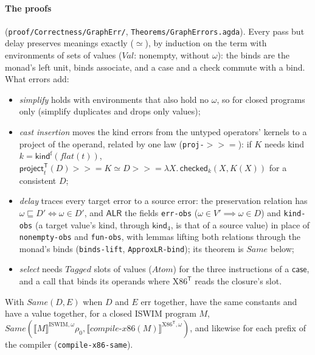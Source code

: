 \documentclass[10pt]{article}
\theoremstyle{acmplain}
\newcommand{\SEM}[1]{\llbracket #1 \rrbracket}
\newcommand{\key}[1]{\mathsf{#1}}
\newcommand{\pass}[1]{\mathit{#1}}
\newcommand{\bind}{\mathbin{>\!\!>\!\!=}}
\newcommand{\Tl}[1]{\textrm{#1}^{\mathsf{T}}}  %
\newcommand{\Tflatof}[1]{\mathit{flat}(#1)}    %
\newcommand{\Tkindf}{\key{kind}^{\mathrm{f}}}             %
\newcommand{\Tkindfour}{\key{kind}_4}
\newcommand{\Same}{\mathit{Same}}
\begin{document}
\paragraph{The proofs} (\texttt{proof/Correctness/GraphErr/},
\texttt{Theorems/GraphErrors.agda}). Every pass but delay preserves
meanings exactly ($\simeq$), by induction on the term with environments of
sets of values ($\mathit{Val}$: nonempty, without $\omega$): the binds are
the monad's left unit, binds associate, and a case and a check commute with
a bind. What errors add:
\begin{itemize}
\item \emph{simplify} holds with environments that also hold no $\omega$,
  so for closed programs only (simplify duplicates and drops only values);
\item \emph{cast insertion} moves the kind errors from the untyped
  operators' kernels to a project of the operand, related by one law
  (\texttt{proj-$\bind$}): if $K$ needs kind $k = \Tkindf(\Tflatof{t})$,
  $\key{project}^{\mathsf{T}}_t(D) \bind K \simeq D \bind \lambda X.\,
  \key{checked}_k(X, K(X))$ for a consistent $D$;
\item \emph{delay} traces every target error to a source error: the
  preservation relation has $\omega \sqsubseteq D' \iff \omega \in D'$, and
  $\mathsf{ALR}$ the fields \texttt{err-obs} ($\omega \in V' \implies \omega
  \in D$) and \texttt{kind-obs} (a target value's kind, through
  $\Tkindfour$, is that of a source value) in place of \texttt{nonempty-obs}
  and \texttt{fun-obs}, with lemmas lifting both relations through the
  monad's binds (\texttt{binds-lift}, \texttt{ApproxLR-bind}); its theorem
  is $\Same$ below;
\item \emph{select} needs $\mathit{Tagged}$ slots of values
  ($\mathit{Atom}$) for the three instructions of a $\key{case}$, and a call
  that binds its operands where $\Tl{X86}$ reads the closure's slot.
\end{itemize}
With $\Same(D, E)$ when $D$ and $E$ err together, have the same constants
and have a value together, for a closed ISWIM program $M$,
$\Same(\SEM{M}^{\mathrm{ISWIM},\omega}\rho_0,
\SEM{\pass{compile\text{-}x86}(M)}^{\Tl{X86},\omega})$, and likewise for each
prefix of the compiler (\texttt{compile-x86-same}).
\end{document}
